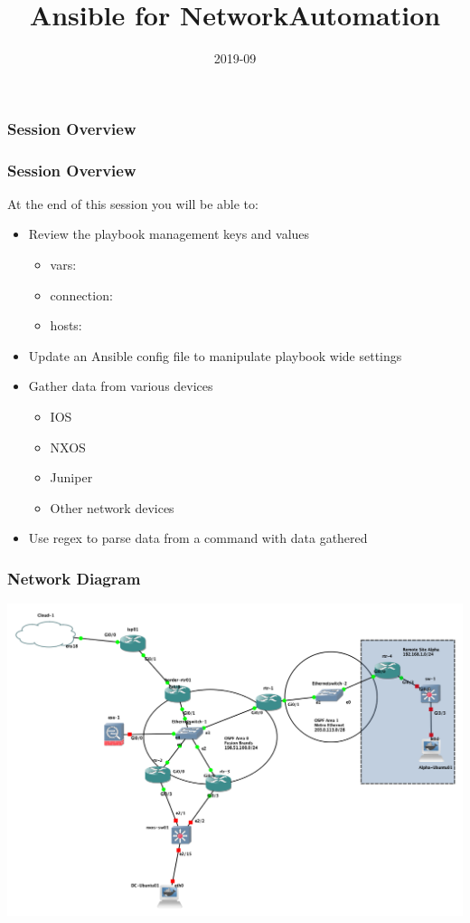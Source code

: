 \documentclass{beamer}
\title{Ansible for NetworkAutomation}
\date{2019-09}
\begin{document}
\frame{\titlepage}

\begin{frame}
    \frametitle{Session Overview}
    \tableofcontents
\end{frame}

\begin{frame}
\frametitle{Session Overview}
At the end of this session you will be able to:
\begin{itemize}
    
  \item <2-> Review the playbook management keys and values
  \begin{itemize}
    \item <3-> vars:
    \item <4-> connection:
    \item <5-> hosts:
  \end{itemize}
  \item <6-> Update an Ansible config file to manipulate playbook wide settings
  \item <7-> Gather data from various devices
    \begin{itemize}
        \item IOS
        \item NXOS
        \item Juniper
        \item Other network devices
    \end{itemize}
  \item <8-> Use regex to parse data from a command with data gathered
\end{itemize}
\end{frame}

\begin{frame}
\frametitle{Network Diagram}
\includegraphics[width=\textwidth]{assets/base_setup.png}
\end{frame}
\end{document}
